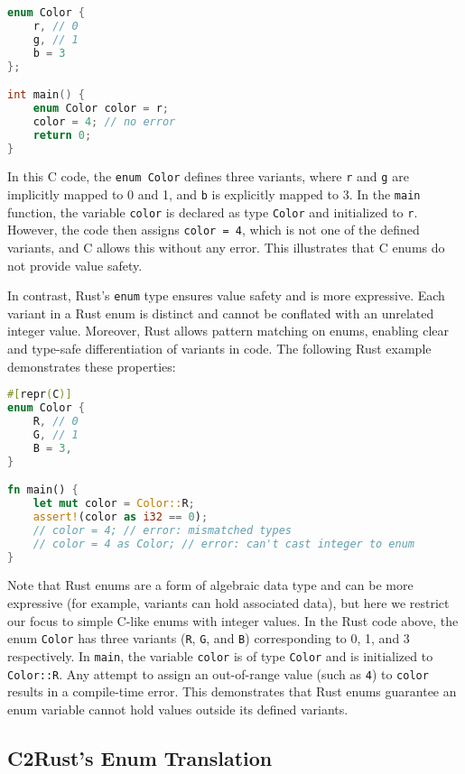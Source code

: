 \documentclass[10pt,conference]{IEEEtran}
\begin{document}
\begin{lstlisting}[language=C]
enum Color {
    r, // 0
    g, // 1
    b = 3
};

int main() {
    enum Color color = r;
    color = 4; // no error
    return 0;
}
\end{lstlisting}

In this C code, the \texttt{enum Color} defines three variants, where \texttt{r} and \texttt{g} are implicitly mapped to 0 and 1, and \texttt{b} is explicitly mapped to 3. In the \texttt{main} function, the variable \texttt{color} is declared as type \texttt{Color} and initialized to \texttt{r}. However, the code then assigns \texttt{color = 4}, which is not one of the defined variants, and C allows this without any error. This illustrates that C enums do not provide value safety.

In contrast, Rust's \texttt{enum} type ensures value safety and is more expressive. Each variant in a Rust enum is distinct and cannot be conflated with an unrelated integer value. Moreover, Rust allows pattern matching on enums, enabling clear and type-safe differentiation of variants in code. The following Rust example demonstrates these properties:

\begin{lstlisting}[language=Rust]
#[repr(C)]
enum Color {
    R, // 0
    G, // 1
    B = 3,
}

fn main() {
    let mut color = Color::R;
    assert!(color as i32 == 0);
    // color = 4; // error: mismatched types
    // color = 4 as Color; // error: can't cast integer to enum
}
\end{lstlisting}

Note that Rust enums are a form of algebraic data type and can be more expressive (for example, variants can hold associated data), but here we restrict our focus to simple C-like enums with integer values. In the Rust code above, the enum \texttt{Color} has three variants (\texttt{R}, \texttt{G}, and \texttt{B}) corresponding to 0, 1, and 3 respectively. In \texttt{main}, the variable \texttt{color} is of type \texttt{Color} and is initialized to \texttt{Color::R}. Any attempt to assign an out-of-range value (such as \texttt{4}) to \texttt{color} results in a compile-time error. This demonstrates that Rust enums guarantee an enum variable cannot hold values outside its defined variants.

\subsection{C2Rust's Enum Translation}
\end{document}
